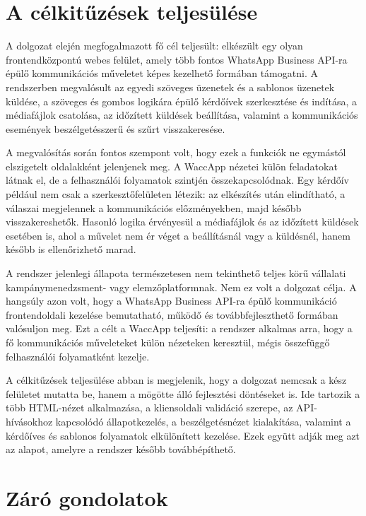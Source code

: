 \section{A célkitűzések teljesülése}

A dolgozat elején megfogalmazott fő cél teljesült: elkészült egy olyan frontendközpontú webes felület, amely több fontos WhatsApp Business API-ra épülő kommunikációs műveletet képes kezelhető formában támogatni. A rendszerben megvalósult az egyedi szöveges üzenetek és a sablonos üzenetek küldése, a szöveges és gombos logikára épülő kérdőívek szerkesztése és indítása, a médiafájlok csatolása, az időzített küldések beállítása, valamint a kommunikációs események beszélgetésszerű és szűrt visszakeresése. 

A megvalósítás során fontos szempont volt, hogy ezek a funkciók ne egymástól elszigetelt oldalakként jelenjenek meg. A WaccApp nézetei külön feladatokat látnak el, de a felhasználói folyamatok szintjén összekapcsolódnak. Egy kérdőív például nem csak a szerkesztőfelületen létezik: az elkészítés után elindítható, a válaszai megjelennek a kommunikációs előzményekben, majd később visszakereshetők. Hasonló logika érvényesül a médiafájlok és az időzített küldések esetében is, ahol a művelet nem ér véget a beállításnál vagy a küldésnél, hanem később is ellenőrizhető marad. 

A rendszer jelenlegi állapota természetesen nem tekinthető teljes körű vállalati kampánymenedzsment- vagy elemzőplatformnak. Nem ez volt a dolgozat célja. A hangsúly azon volt, hogy a WhatsApp Business API-ra épülő kommunikáció frontendoldali kezelése bemutatható, működő és továbbfejleszthető formában valósuljon meg. Ezt a célt a WaccApp teljesíti: a rendszer alkalmas arra, hogy a fő kommunikációs műveleteket külön nézeteken keresztül, mégis összefüggő felhasználói folyamatként kezelje. 

A célkitűzések teljesülése abban is megjelenik, hogy a dolgozat nemcsak a kész felületet mutatta be, hanem a mögötte álló fejlesztési döntéseket is. Ide tartozik a több HTML-nézet alkalmazása, a kliensoldali validáció szerepe, az API-hívásokhoz kapcsolódó állapotkezelés, a beszélgetésnézet kialakítása, valamint a kérdőíves és sablonos folyamatok elkülönített kezelése. Ezek együtt adják meg azt az alapot, amelyre a rendszer később továbbépíthető. 

\section{Záró gondolatok}

